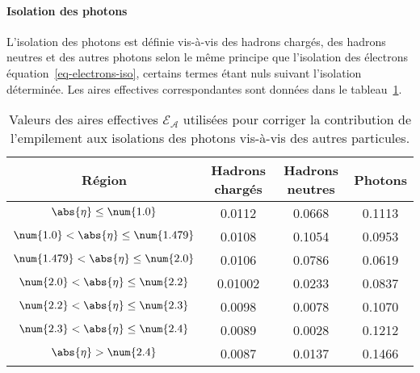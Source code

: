 \paragraph{Isolation des photons}
L'isolation des photons est définie vis-à-vis
des hadrons chargés,
des hadrons neutres et
des autres photons
selon le même principe que l'isolation des électrons équation~\eqref{eq-electrons-iso}, certains termes étant nuls suivant l'isolation déterminée.
Les aires effectives correspondantes sont données dans le tableau~\ref{tab-photon-effective_areas}.
\begin{table}[h]
\centering
\begin{tabular}{cccc}
\toprule
Région & Hadrons chargés & Hadrons neutres & Photons \\
\midrule
$\abs{\eta} \leq \num{1.0}$ & \num{0.0112} & \num{0.0668} & \num{0.1113} \\
$\num{1.0} < \abs{\eta} \leq \num{1.479}$ & \num{0.0108} & \num{0.1054} & \num{0.0953} \\
$\num{1.479} < \abs{\eta} \leq \num{2.0}$ & \num{0.0106} & \num{0.0786} & \num{0.0619} \\
$\num{2.0} < \abs{\eta} \leq \num{2.2}$ & \num{0.01002} & \num{0.0233} & \num{0.0837} \\
$\num{2.2} < \abs{\eta} \leq \num{2.3}$ & \num{0.0098} & \num{0.0078} & \num{0.1070} \\
$\num{2.3} < \abs{\eta} \leq \num{2.4}$ & \num{0.0089} & \num{0.0028} & \num{0.1212} \\
$\abs{\eta} > \num{2.4}$ & \num{0.0087} & \num{0.0137} & \num{0.1466} \\
\bottomrule
\end{tabular}
\caption[Aires effectives de correction de l'isolation du photon.]{Valeurs des aires effectives $\mathcal{E_A}$ utilisées pour corriger la contribution de l'empilement aux isolations des photons vis-à-vis des autres particules.}
\label{tab-photon-effective_areas}
\end{table}
